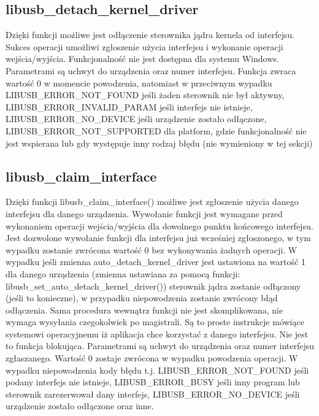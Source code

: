 \documentclass{BscUS}
\begin{document}
\subsection{libusb\_detach\_kernel\_driver}
\noindent Dzięki funkcji możliwe jest odłączenie sterownika jądra kernela od interfejsu.
Sukces operacji umożliwi zgłoszenie użycia interfejsu i wykonanie operacji wejścia/wyjścia.
Funkcjonalność nie jest dostępna dla systemu Windows.
Parametrami są uchwyt do urządzenia oraz numer interfejsu.
Funkcja zwraca wartość 0 w momencie powodzenia, natomiast w przeciwnym wypadku LIBUSB\_ERROR\_NOT\_FOUND jeśli żaden sterownik nie był aktywny, LIBUSB\_ERROR\_INVALID\_PARAM jeśli interfejs nie istnieje, LIBUSB\_ERROR\_NO\_DEVICE jeśli urządzenie zostało odłączone, LIBUSB\_ERROR\_NOT\_SUPPORTED dla platform, gdzie funkcjonalność nie jest wspierana lub gdy występuje inny rodzaj błędu (nie wymieniony w tej sekcji)
\subsection{libusb\_claim\_interface}
\noindent Dzięki funkcji libusb\_claim\_interface() możliwe jest zgłoszenie użycia danego interfejsu dla danego urządzenia.
Wywołanie funkcji jest wymagane przed wykonaniem operacji wejścia/wyjścia dla dowolnego punktu końcowego interfejsu.
Jest dozwolone wywołanie funkcji dla interfejsu już wcześniej zgłoszonego, w tym wypadku zostanie zwrócona wartość 0 bez wykonywania żadnych operacji.
W wypadku jeśli zmienna auto\_detach\_kernel\_driver jest ustawiona na wartość 1 dla danego urządzenia (zmienna ustawiana za pomocą funkcji: libusb\_set\_auto\_detach\_kernel\_driver()) sterownik jądra zostanie odłączony (jeśli to konieczne), w przypadku niepowodzenia zostanie zwrócony błąd odłączenia.
Sama procedura wewnątrz funkcji nie jest skomplikowana, nie wymaga wysyłania czegokolwiek po magistrali. Są to proste instrukcje mówiące systemowi operacyjnemu iż aplikacja chce korzystać z danego interfejsu.
Nie jest to funkcja blokująca.
Parametrami są uchwyt do urządzenia oraz numer interfejsu zgłaszanego.
Wartość 0 zostaje zwrócona w wypadku powodzenia operacji.
W wypadku niepowodzenia kody błędu t.j. LIBUSB\_ERROR\_NOT\_FOUND jeśli podany interfejs nie istnieje, LIBUSB\_ERROR\_BUSY jeśli inny program lub sterownik zarezerwował dany interfejs, LIBUSB\_ERROR\_NO\_DEVICE jeśli urządzenie zostało odłączone oraz inne.
\end{document}
